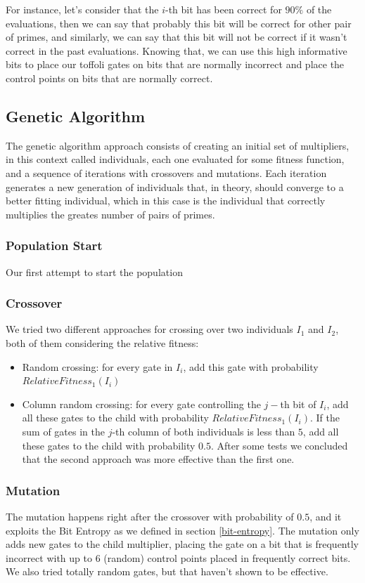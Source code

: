 \documentclass[12pt]{article}
\begin{document}
For instance, let's consider that the $i$-th bit has been correct for $90\%$ of the evaluations, then we can say that probably this bit will be correct for other pair of primes, and similarly, we can say that this bit will not be correct if it wasn't correct in the past evaluations. Knowing that, we can use this high informative bits to place our toffoli gates on bits that are normally incorrect and place the control points on bits that are normally correct.

\subsection{Genetic Algorithm}
The genetic algorithm approach consists of creating an initial set of multipliers, in this context called individuals, each one evaluated for some fitness function, and a sequence of iterations with crossovers and mutations. Each iteration generates a new generation of individuals that, in theory, should converge to a better fitting individual, which in this case is the individual that correctly multiplies the greates number of pairs of primes.

\subsubsection{Population Start}
Our first attempt to start the population 

\subsubsection{Crossover}
We tried two different approaches for crossing over two individuals $I_1$ and $I_2$, both of them considering the relative fitness:
\begin{itemize}
    \item{Random crossing: for every gate in $I_i$, add this gate with probability $RelativeFitness_1 (I_i)$}
    \item{Column random crossing: for every gate controlling the $j-$th bit of $I_i$, add all these gates to the child with probability $RelativeFitness_1 (I_i)$. If the sum of gates in the $j$-th column of both individuals is less than $5$, add all these gates to the child with probability $0.5$.}
    After some tests we concluded that the second approach was more effective than the first one.
\end{itemize}

\subsubsection{Mutation}
The mutation happens right after the crossover with probability of $0.5$, and it exploits the Bit Entropy as we defined in section \ref{bit-entropy}. The mutation only adds new gates to the child multiplier, placing the gate on a bit that is frequently incorrect with up to $6$ (random) control points placed in frequently correct bits. We also tried totally random gates, but that haven't shown to be effective.
\end{document}
